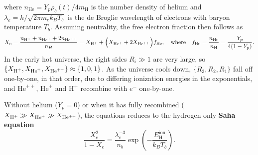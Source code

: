 \documentclass[10pt,a4paper]{article}
\begin{document}
where $n_\text{He} = Y_p \rho_b(t) / 4 m_\text{H}$ is the number density of helium and $\lambda_e = h / \sqrt{2 \pi m_e k_B T_b}$ is the de Broglie wavelength of electrons with baryon temperature $T_b$.
Assuming neutrality, the free electron fraction then follows as
\begin{equation}
    X_e = \frac{n_{\text{H}^+} + n_{\text{He}^+} + 2 n_{\text{He}^{++}}}{n_H} = X_{\text{H}^+} +  \Big( X_{\text{He}^+} + 2 X_{\text{He}^{++}} \Big) f_\text{He}, \quad \text{where} \quad f_\text{He} = \frac{n_\text{He}}{n_\text{H}} = \frac{Y_p}{4(1-Y_p)}.
\label{eq_Saha_H_He_Xe}
\end{equation}
In the early hot universe, the right sides $R_i \gg 1$ are very large, so $\{X_{\text{H}^+},X_{\text{He}^+},X_{\text{He}^{++}}\} \approx \{1,0,1\}$.
As the universe cools down, $\{R_3, R_2, R_1\}$ fall off one-by-one, in that order, due to differing ionization energies in the exponentials,
and $\text{He}^{++}$, $\text{He}^+$ and $\text{H}^+$ recombine with $e^-$ one-by-one.

Without helium ($Y_p=0$) or when it has fully recombined ($X_{\text{H}^+} \gg X_{\text{He}^+} \gg X_{\text{He}^{++}}$),
the equations reduces to the hydrogen-only \textbf{Saha equation}
\begin{equation}
	\frac{X_e^2}{1-X_e} = \frac{\lambda_e^{-3}}{n_b} \exp \left( -\frac{E^\text{ion}_\text{H}}{k_B T_b} \right).
\label{eq_saha_H}
\end{equation}
\end{document}
